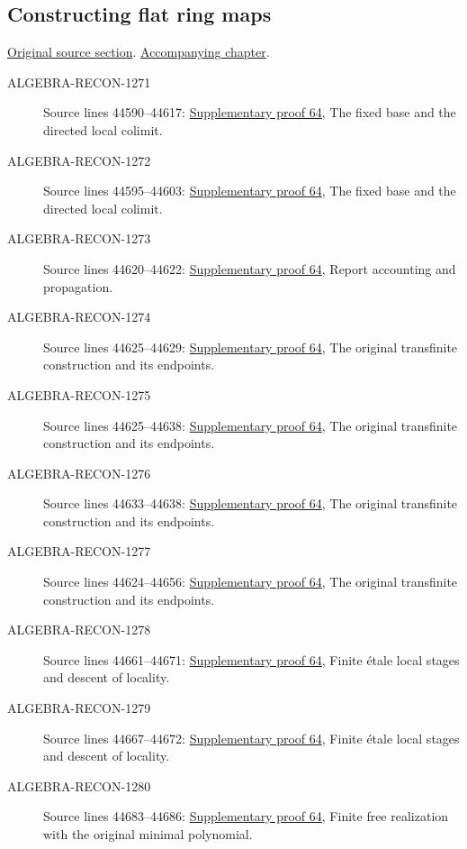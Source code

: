 \subsection{Constructing flat ring maps}
\hypertarget{algebra-source-section-constructing-flat}{}
\noindent\href{https://github.com/stacks/stacks-project/blob/a04446e57ec1fbc252a871afcec7752fb2807b14/algebra.tex\#L44566}{Original source section}. \href{algebra.pdf\#nameddest=section-constructing-flat}{Accompanying chapter}.

\begin{description}
\item[ALGEBRA-RECON-1271] Source lines 44590--44617: \hyperlink{algebra_construct_flat_notes_20260929}{Supplementary proof 64}, The fixed base and the directed local colimit.
\item[ALGEBRA-RECON-1272] Source lines 44595--44603: \hyperlink{algebra_construct_flat_notes_20260929}{Supplementary proof 64}, The fixed base and the directed local colimit.
\item[ALGEBRA-RECON-1273] Source lines 44620--44622: \hyperlink{algebra_construct_flat_notes_20260929}{Supplementary proof 64}, Report accounting and propagation.
\item[ALGEBRA-RECON-1274] Source lines 44625--44629: \hyperlink{algebra_construct_flat_notes_20260929}{Supplementary proof 64}, The original transfinite construction and its endpoints.
\item[ALGEBRA-RECON-1275] Source lines 44625--44638: \hyperlink{algebra_construct_flat_notes_20260929}{Supplementary proof 64}, The original transfinite construction and its endpoints.
\item[ALGEBRA-RECON-1276] Source lines 44633--44638: \hyperlink{algebra_construct_flat_notes_20260929}{Supplementary proof 64}, The original transfinite construction and its endpoints.
\item[ALGEBRA-RECON-1277] Source lines 44624--44656: \hyperlink{algebra_construct_flat_notes_20260929}{Supplementary proof 64}, The original transfinite construction and its endpoints.
\item[ALGEBRA-RECON-1278] Source lines 44661--44671: \hyperlink{algebra_construct_flat_notes_20260929}{Supplementary proof 64}, Finite étale local stages and descent of locality.
\item[ALGEBRA-RECON-1279] Source lines 44667--44672: \hyperlink{algebra_construct_flat_notes_20260929}{Supplementary proof 64}, Finite étale local stages and descent of locality.
\item[ALGEBRA-RECON-1280] Source lines 44683--44686: \hyperlink{algebra_construct_flat_notes_20260929}{Supplementary proof 64}, Finite free realization with the original minimal polynomial.

\end{description}

